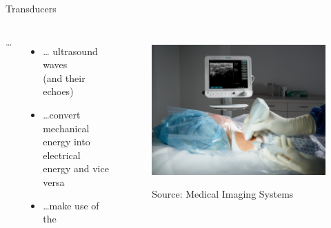 \begin{frame}{Transducers}

    \begin{columns}[T]
         \dots
        \vspace{.5cm}
        \begin{itemize}
            \item \dots {} ultrasound waves\\(and their echoes)
                  \vspace{.5cm}
            \item \dots convert mechanical energy into electrical energy and vice versa
                  \vspace{.5cm}
            \item \dots make use of the 
        \end{itemize}

        \begin{figure}
            \centering
            \includegraphics[width=0.9\columnwidth]{images/SH_US_39038_14.jpg}\\
            \begin{flushright}
                \tiny Source: Medical Imaging Systems~\cite{neumann18}
            \end{flushright}
        \end{figure}

    \end{columns}
\end{frame}


